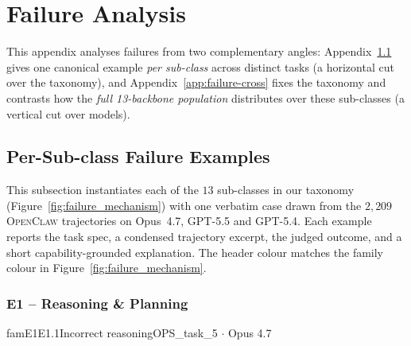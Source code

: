 \FloatBarrier
\section{Failure Analysis}
\label{app:failure-analysis}

This appendix analyses \Eyeson{} failures from two complementary angles:
Appendix~\ref{app:failure-examples} gives one canonical example \emph{per sub-class}
across distinct tasks (a horizontal cut over the taxonomy), and
Appendix~\ref{app:failure-cross} fixes the taxonomy and contrasts how the
\emph{full 13-backbone population} distributes over these sub-classes
(a vertical cut over models).

\subsection{Per-Sub-class Failure Examples}
\label{app:failure-examples}

This subsection instantiates each of the $13$ sub-classes in our taxonomy
(Figure~\ref{fig:failure_mechanism}) with one verbatim case drawn from the
$2{,}209$ \textsc{OpenClaw} trajectories on Opus~4.7, GPT-5.5 and GPT-5.4.
Each example reports the task spec, a condensed trajectory excerpt, the
judged outcome, and a short capability-grounded explanation. The header
colour matches the family colour in Figure~\ref{fig:failure_mechanism}.

\subsubsection{E1 -- Reasoning \& Planning}

\begin{failbox}{famE1}{E1.1}{Incorrect reasoning}{OPS\_task\_5 \(\cdot\) Opus 4.7}
\end{failbox}

